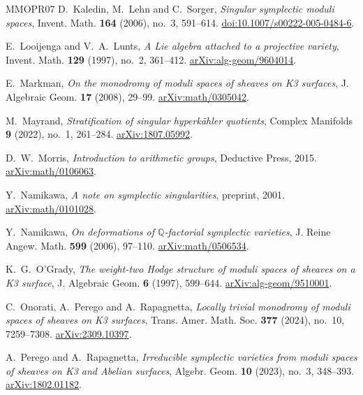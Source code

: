 \begin{thebibliography}{MMOPR07}
D.~Kaledin, M.~Lehn and C.~Sorger,
\emph{Singular symplectic moduli spaces},
Invent. Math. \textbf{164} (2006), no.~3, 591--614.
\href{https://doi.org/10.1007/s00222-005-0484-6}{doi:10.1007/s00222-005-0484-6}.

E.~Looijenga and V.~A.~Lunts,
\emph{A Lie algebra attached to a projective variety},
Invent. Math. \textbf{129} (1997), no.~2, 361--412.
\href{https://arxiv.org/abs/alg-geom/9604014}{arXiv:alg-geom/9604014}.

E.~Markman, \emph{On the monodromy of moduli spaces of sheaves on K3
surfaces}, J. Algebraic Geom. \textbf{17} (2008), 29--99.
\href{https://arxiv.org/abs/math/0305042}{arXiv:math/0305042}.

M.~Mayrand, \emph{Stratification of singular hyperk\"ahler quotients},
Complex Manifolds \textbf{9} (2022), no.~1, 261--284.
\href{https://arxiv.org/abs/1807.05992}{arXiv:1807.05992}.

D.~W.~Morris, \emph{Introduction to arithmetic groups}, Deductive
Press, 2015.
\href{https://arxiv.org/abs/math/0106063}{arXiv:math/0106063}.

Y.~Namikawa, \emph{A note on symplectic singularities},
preprint, 2001.
\href{https://arxiv.org/abs/math/0101028}{arXiv:math/0101028}.

Y.~Namikawa, \emph{On deformations of $\mathbb Q$-factorial
symplectic varieties}, J. Reine Angew. Math. \textbf{599} (2006),
97--110.
\href{https://arxiv.org/abs/math/0506534}{arXiv:math/0506534}.

K.~G.~O'Grady, \emph{The weight-two Hodge structure of moduli spaces
of sheaves on a K3 surface}, J. Algebraic Geom. \textbf{6} (1997),
599--644.
\href{https://arxiv.org/abs/alg-geom/9510001}{arXiv:alg-geom/9510001}.

C.~Onorati, A.~Perego and A.~Rapagnetta,
\emph{Locally trivial monodromy of moduli spaces of sheaves on K3
surfaces}, Trans. Amer. Math. Soc. \textbf{377} (2024), no.~10,
7259--7308.
\href{https://arxiv.org/abs/2309.10397}{arXiv:2309.10397}.

A.~Perego and A.~Rapagnetta,
\emph{Irreducible symplectic varieties from moduli spaces of sheaves
on K3 and Abelian surfaces}, Algebr. Geom. \textbf{10} (2023),
no.~3, 348--393.
\href{https://arxiv.org/abs/1802.01182}{arXiv:1802.01182}.


\end{thebibliography}
